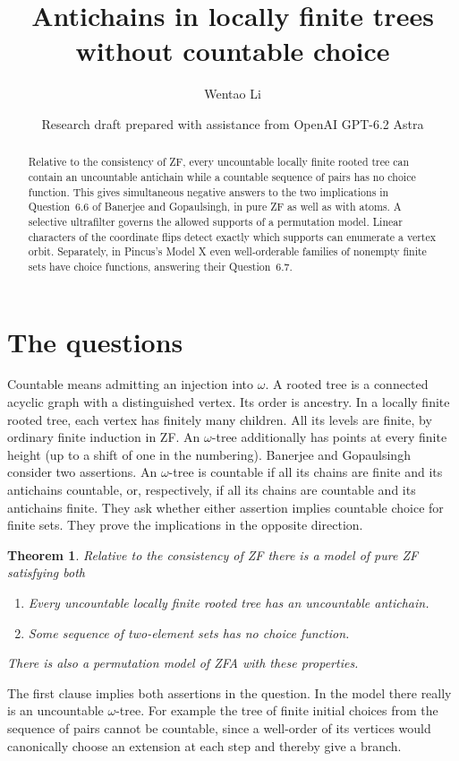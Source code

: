 \documentclass[11pt]{article}
\title{Antichains in locally finite trees without countable choice}
\author{Wentao Li}
\date{Research draft prepared with assistance from OpenAI GPT-6.2 Astra}
\newtheorem{theorem}{Theorem}
\begin{document}
\maketitle
\begin{abstract}
Relative to the consistency of ZF, every uncountable locally finite rooted tree can contain an uncountable antichain while a countable sequence of pairs has no choice function. This gives simultaneous negative answers to the two implications in Question~6.6 of Banerjee and Gopaulsingh, in pure ZF as well as with atoms. A selective ultrafilter governs the allowed supports of a permutation model. Linear characters of the coordinate flips detect exactly which supports can enumerate a vertex orbit. Separately, in Pincus's Model X even well-orderable families of nonempty finite sets have choice functions, answering their Question~6.7.
\end{abstract}

\section{The questions}
Countable means admitting an injection into $\omega$. A rooted tree is a connected acyclic graph with a distinguished vertex. Its order is ancestry. In a locally finite rooted tree, each vertex has finitely many children. All its levels are finite, by ordinary finite induction in ZF. An $\omega$-tree additionally has points at every finite height (up to a shift of one in the numbering). Banerjee and Gopaulsingh \cite[Definitions 2.2, 2.4 and Question 6.6]{bg} consider two assertions. An $\omega$-tree is countable if all its chains are finite and its antichains countable, or, respectively, if all its chains are countable and its antichains finite. They ask whether either assertion implies countable choice for finite sets. They prove the implications in the opposite direction.
\begin{theorem}\label{main}
Relative to the consistency of ZF there is a model of pure ZF satisfying both
\begin{enumerate}
\item Every uncountable locally finite rooted tree has an uncountable antichain.
\item Some sequence of two-element sets has no choice function.
\end{enumerate}
There is also a permutation model of ZFA with these properties.
\end{theorem}
The first clause implies both assertions in the question. In the model there really is an uncountable $\omega$-tree. For example the tree of finite initial choices from the sequence of pairs cannot be countable, since a well-order of its vertices would canonically choose an extension at each step and thereby give a branch.
\end{document}
